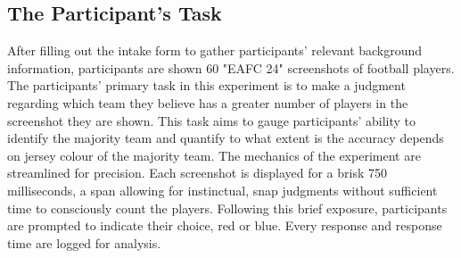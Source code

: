 \subsection{The Participant's Task}

After filling out the intake form to gather participants' relevant background information, participants are shown 60 "EAFC 24" screenshots of football players. The participants' primary task in this experiment is to make a judgment regarding which team they believe has a greater number of players in the screenshot they are shown. This task aims to gauge participants' ability to identify the majority team and quantify to what extent is the accuracy depends on jersey colour of the majority team. The mechanics of the experiment are streamlined for precision. Each screenshot is displayed for a brisk 750 milliseconds, a span allowing for instinctual, snap judgments without sufficient time to consciously count the players. Following this brief exposure, participants are prompted to indicate their choice, red or blue. Every response and response time are logged for analysis.